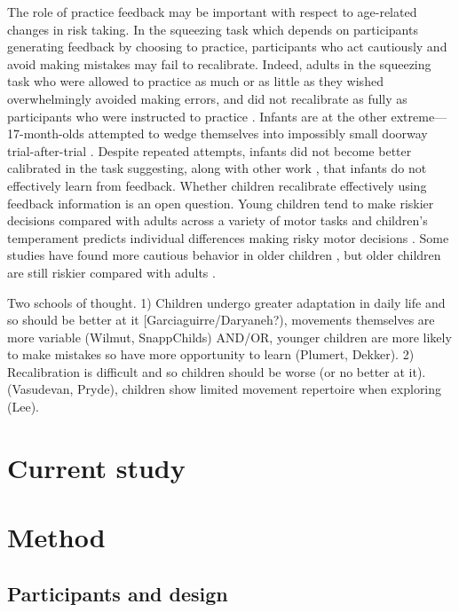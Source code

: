 \documentclass[a4paper,man,natbib,floatsintext,noextraspace]{apa6}
\begin{document}
The role of practice feedback may be important with respect to age-related changes in risk taking. In the squeezing task which depends on participants generating feedback by choosing to practice, participants who act cautiously and avoid making mistakes may fail to recalibrate. Indeed, adults in the squeezing task who were allowed to practice as much or as little as they wished overwhelmingly avoided making errors, and did not recalibrate as fully as participants who were instructed to practice \citep{DoorwayExplore}. Infants are at the other extreme---17-month-olds attempted to wedge themselves into impossibly small doorway trial-after-trial \citep{InfantAps}. Despite repeated attempts, infants did not become better calibrated in the task suggesting, along with other work , that infants do not effectively learn from feedback. Whether children recalibrate effectively using feedback information is an open question. Young children tend to make riskier decisions compared with adults across a variety of motor tasks \citep{ChildReaching, DekkerNardini} and children's temperament predicts individual differences making risky motor decisions \citep{Plumert97}. Some studies have found more cautious behavior in older children \cite{Pryde2003}, but older children are still riskier compared with adults \cite{DekkerNardini}.


Two schools of thought. 1) Children undergo greater adaptation in daily life and so should be better at it [Garciaguirre/Daryaneh?), movements themselves are more variable (Wilmut, SnappChilds) AND/OR, younger children are more likely to make mistakes so have more opportunity to learn (Plumert, Dekker). 2) Recalibration is difficult and so children should be worse (or no better at it). (Vasudevan, Pryde), children show limited movement repertoire when exploring (Lee).

\section{Current study}

\section{Method}

\subsection{Participants and design}
\end{document}
